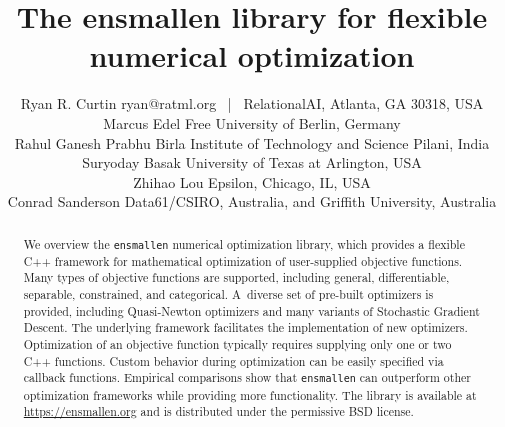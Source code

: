 \documentclass[twoside,11pt]{article}
\begin{document}
\title{The ensmallen library for flexible numerical optimization }

\author{%
  \name Ryan R. Curtin \hfill \email ryan@ratml.org ~|~ \addr RelationalAI, Atlanta, GA 30318, USA\\
  \name Marcus Edel \hfill \addr Free University of Berlin, Germany\\
  \name Rahul Ganesh Prabhu \hfill \addr Birla Institute of Technology and Science Pilani, India\\
  \name Suryoday Basak \hfill \addr University of Texas at Arlington, USA\\
  \name Zhihao Lou \hfill \addr Epsilon, Chicago, IL, USA\\
  \name Conrad Sanderson \hfill \addr Data61/CSIRO, Australia, and Griffith University, Australia%
  }



\maketitle

\begin{abstract}%
We overview the {\tt ensmallen} numerical optimization library,
which provides a flexible C++ framework
for mathematical optimization of user-supplied objective functions.
Many types of objective functions are supported,
including general, differentiable, separable, constrained, and categorical.
A~diverse set of pre-built optimizers is provided,
including Quasi-Newton optimizers and many variants of Stochastic Gradient Descent.
The underlying framework facilitates the implementation of new optimizers.
Optimization of an objective function typically requires supplying only one or two {C++} functions.
Custom behavior during optimization can be easily specified via callback functions.
Empirical comparisons show that {\tt ensmallen}
can outperform other optimization frameworks while providing more functionality.
The library is available at \url{https://ensmallen.org}
and is distributed under the permissive BSD license.

\end{abstract}
\end{document}
